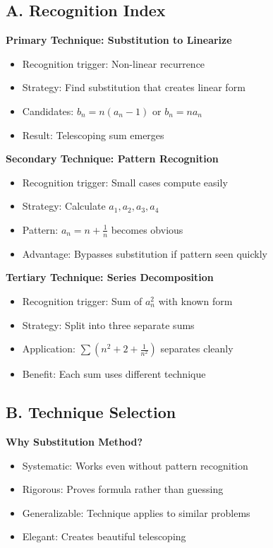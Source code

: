 \documentclass[12pt]{article}
\begin{document}
\begin{techniquesbox}

\subsection*{A. Recognition Index}

\textbf{Primary Technique: Substitution to Linearize}
\begin{itemize}
    \item Recognition trigger: Non-linear recurrence
    \item Strategy: Find substitution that creates linear form
    \item Candidates: $b_n = n(a_n - 1)$ or $b_n = na_n$
    \item Result: Telescoping sum emerges
\end{itemize}

\textbf{Secondary Technique: Pattern Recognition}
\begin{itemize}
    \item Recognition trigger: Small cases compute easily
    \item Strategy: Calculate $a_1, a_2, a_3, a_4$
    \item Pattern: $a_n = n + \frac{1}{n}$ becomes obvious
    \item Advantage: Bypasses substitution if pattern seen quickly
\end{itemize}

\textbf{Tertiary Technique: Series Decomposition}
\begin{itemize}
    \item Recognition trigger: Sum of $a_n^2$ with known form
    \item Strategy: Split into three separate sums
    \item Application: $\sum(n^2 + 2 + \frac{1}{n^2})$ separates cleanly
    \item Benefit: Each sum uses different technique
\end{itemize}

\subsection*{B. Technique Selection}

\textbf{Why Substitution Method?}
\begin{itemize}
    \item Systematic: Works even without pattern recognition
    \item Rigorous: Proves formula rather than guessing
    \item Generalizable: Technique applies to similar problems
    \item Elegant: Creates beautiful telescoping
\end{itemize}


\end{techniquesbox}
\end{document}
